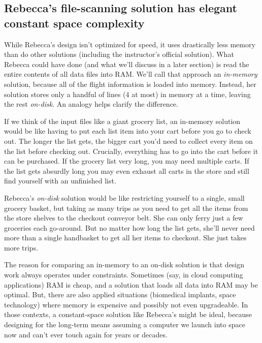 \subsection{Rebecca's file-scanning solution has elegant constant space complexity}\label{rebeccas-file-scanning-solution-has-elegant-constant-space-complexity}

While Rebecca's design isn't optimized for speed, it uses drastically less memory than do other solutions (including the instructor's official solution). What Rebecca could have done (and what we'll discuss in a later section) is read the entire contents of all data files into RAM. We'll call that approach an \emph{in-memory} solution, because all of the flight information is loaded into memory. Instead, her solution stores only a handful of lines (4 at most) in memory at a time, leaving the rest \emph{on-disk}. An analogy helps clarify the difference.

If we think of the input files like a giant grocery list, an in-memory solution would be like having to put each list item into your cart before you go to check out. The longer the list gets, the bigger cart you'd need to collect every item on the list before checking out. Crucially, everything has to go into the cart before it can be purchased. If the grocery list very long, you may need multiple carts. If the list gets absurdly long you may even exhaust all carts in the store and still find yourself with an unfinished list.

Rebecca's \emph{on-disk} solution would be like restricting yourself to a single, small grocery basket, but taking as many trips as you need to get all the items from the store shelves to the checkout conveyor belt. She can only ferry just a few groceries each go-around. But no matter how long the list gets, she'll never need more than a single handbasket to get all her items to checkout. She just takes more trips.

The reason for comparing an in-memory to an on-disk solution is that design work always operates under constraints. Sometimes (say, in cloud computing applications) RAM is cheap, and a solution that loads all data into RAM may be optimal. But, there are also applied situations (biomedical implants, space technology) where memory is expensive and possibly not even upgradeable. In those contexts, a constant-space solution like Rebecca's might be ideal, because designing for the long-term means assuming a computer we launch into space now and can't ever touch again for years or decades.

